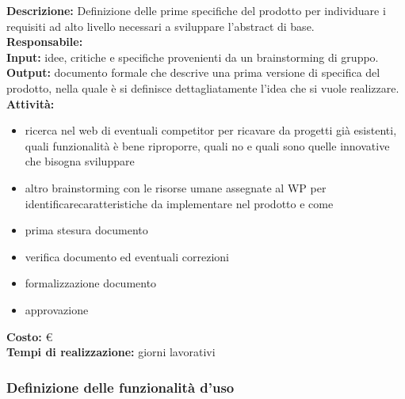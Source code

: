 \textbf{Descrizione:} Definizione delle prime specifiche del prodotto per individuare i requisiti
ad alto livello necessari a sviluppare l’abstract di base.\\
\linebreak
\textbf{Responsabile:} \\
\linebreak
\textbf{Input:} idee, critiche e specifiche provenienti da un brainstorming di gruppo. \\
\linebreak
\textbf{Output:} documento formale che descrive una prima versione di specifica del prodotto,
nella quale è si definisce dettagliatamente l’idea che si vuole realizzare.\\
\linebreak
\textbf{Attività:}
\begin{itemize}
\item ricerca nel web di eventuali competitor per ricavare da progetti già esistenti, quali
funzionalità è bene riproporre, quali no e quali sono quelle innovative che bisogna
sviluppare
\item altro brainstorming con le risorse umane assegnate al WP per identificarecaratteristiche da implementare nel prodotto e come
\item prima stesura documento
\item verifica documento ed eventuali correzioni
\item formalizzazione documento
\item approvazione
\end{itemize}
\textbf{Costo:} \euro \\
\textbf{Tempi di realizzazione:} giorni lavorativi


\subsubsection{Definizione delle funzionalità d'uso}

